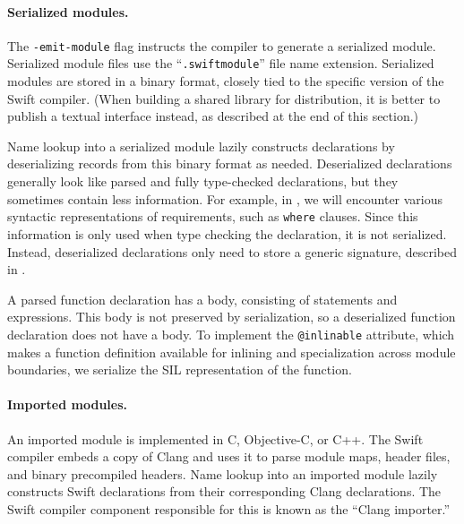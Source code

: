 \documentclass[../generics]{subfiles}
\begin{document}
\paragraph{Serialized modules.} The \texttt{-emit-module} flag instructs the compiler to generate a serialized module. Serialized module files use the ``\texttt{.swiftmodule}'' file name extension. Serialized modules are stored in a binary format, closely tied to the specific version of the Swift compiler. (When building a shared library for distribution, it is better to publish a textual interface instead, as described at the end of this section.)

Name lookup into a serialized module lazily constructs declarations by deserializing records from this binary format as needed. Deserialized declarations generally look like parsed and fully type-checked declarations, but they sometimes contain less information. For example, in , we will encounter various syntactic representations of requirements, such as \texttt{where} clauses. Since this information is only used when type checking the declaration, it is not serialized. Instead, deserialized declarations only need to store a generic signature, described in .

A parsed function declaration has a body, consisting of statements and expressions. This body is not preserved by serialization, so a deserialized function declaration does not have a body. To implement the \texttt{@inlinable} attribute, which makes a function definition available for inlining and specialization across module boundaries, we serialize the SIL representation of the function.

\paragraph{Imported modules.} An imported module is implemented in C, Objective-C, or C++. The Swift compiler embeds a copy of Clang and uses it to parse module maps, header files, and binary precompiled headers. Name lookup into an imported module lazily constructs Swift declarations from their corresponding Clang declarations. The Swift compiler component responsible for this is known as the ``Clang importer.''
\end{document}
